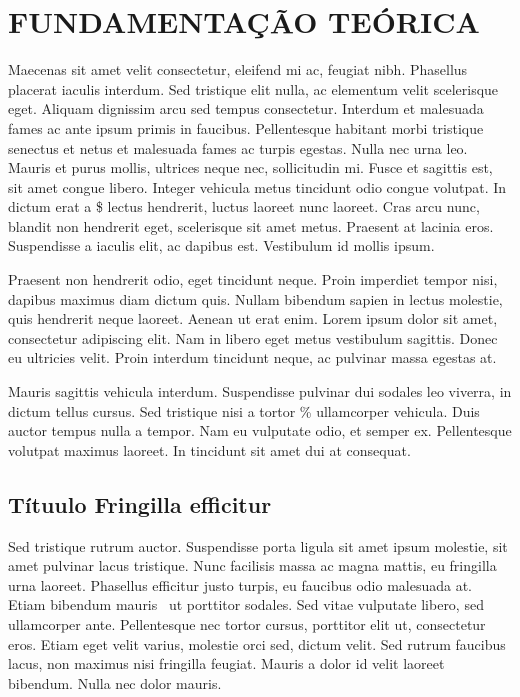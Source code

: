 \chapter{FUNDAMENTAÇÃO TEÓRICA}
\label{cap:fundamentacao}

Maecenas sit amet velit consectetur, eleifend mi ac, feugiat nibh. Phasellus placerat iaculis interdum. Sed tristique elit nulla, ac elementum velit scelerisque eget. Aliquam dignissim arcu sed tempus consectetur. Interdum et malesuada fames ac ante ipsum primis in faucibus. Pellentesque habitant morbi tristique senectus et netus et malesuada fames ac turpis egestas. Nulla nec urna leo. Mauris et purus mollis, ultrices neque nec, sollicitudin mi. Fusce et sagittis est, sit amet congue libero. Integer vehicula metus tincidunt odio congue volutpat. In dictum erat a \$ lectus hendrerit, luctus laoreet nunc laoreet. Cras arcu nunc, blandit non hendrerit eget, scelerisque sit amet metus. Praesent at lacinia eros. Suspendisse a iaculis elit, ac dapibus est. Vestibulum id mollis ipsum.

Praesent non hendrerit odio, eget tincidunt neque. Proin imperdiet tempor nisi, dapibus maximus diam dictum quis. Nullam bibendum sapien in lectus molestie, quis hendrerit neque laoreet. Aenean ut erat enim. Lorem ipsum dolor sit amet, consectetur adipiscing elit. Nam in libero eget metus vestibulum sagittis. Donec eu ultricies velit. Proin interdum tincidunt neque, ac pulvinar massa egestas at.

Mauris sagittis vehicula interdum. Suspendisse pulvinar dui sodales leo viverra, in dictum tellus cursus. Sed tristique nisi a tortor \% ullamcorper vehicula. Duis auctor tempus nulla a tempor. Nam eu vulputate odio, et semper ex. Pellentesque volutpat maximus laoreet. In tincidunt sit amet dui at consequat.

\section{Títuulo Fringilla efficitur}

Sed tristique rutrum auctor. Suspendisse porta ligula sit amet ipsum molestie, sit amet pulvinar lacus tristique. Nunc facilisis massa ac magna mattis, eu fringilla urna laoreet. Phasellus efficitur justo turpis, eu faucibus odio malesuada at. Etiam bibendum mauris \textcopyright\ ut porttitor sodales. Sed vitae vulputate libero, sed ullamcorper ante. Pellentesque nec tortor cursus, porttitor elit ut, consectetur eros. Etiam eget velit varius, molestie orci sed, dictum velit. Sed rutrum faucibus lacus, non maximus nisi fringilla feugiat. Mauris a dolor id velit laoreet bibendum. Nulla nec dolor mauris.

